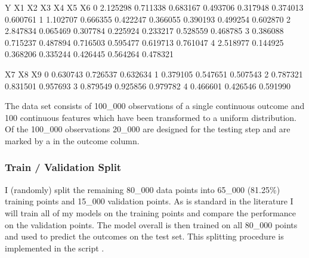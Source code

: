 \documentclass[letterpaper,10pt,english]{sphinxmanual}
\begin{document}
\begin{sphinxVerbatim}[commandchars=\\\{\}]
 
   
   
  
\end{sphinxVerbatim}

\begin{sphinxVerbatim}[commandchars=\\\{\}]
      
\PYG{p}{[} \PYG{p}{]}
\end{sphinxVerbatim}

\begin{sphinxVerbatim}[commandchars=\\\{\}]
          Y        X1        X2        X3        X4        X5        X6  \PYGZbs{}
0  2.125298  0.711338  0.683167  0.493706  0.317948  0.374013  0.600761   
1 \PYGZhy{}1.102707  0.666355  0.422247  0.366055  0.390193  0.499254  0.602870   
2 \PYGZhy{}2.847834  0.065469  0.307784  0.225924  0.233217  0.528559  0.468785   
3 \PYGZhy{}0.386088  0.715237  0.487894  0.716503  0.595477  0.619713  0.761047   
4  2.518977  0.144925  0.368206  0.335244  0.426445  0.564264  0.478321   

         X7        X8        X9  
0  0.630743  0.726537  0.632634  
1  0.379105  0.547651  0.507543  
2  0.787321  0.831501  0.957693  
3  0.879549  0.925856  0.979782  
4  0.466601  0.426546  0.591990  
\end{sphinxVerbatim}

The data set consists of 100\_000 observations of a single continuous outcome and 100 continuous features which have been transformed to a uniform distribution. Of the 100\_000 observations 20\_000 are designed for the testing step and are marked by a  in the outcome column.


\subsubsection{Train / Validation Split}
\label{\detokenize{simulated_intro:train-validation-split}}
I (randomly) split the remaining 80\_000  data points into 65\_000 (81.25\%) training points and 15\_000 validation points. As is standard in the literature I will train all of my models on the training points and compare the performance on the validation points. The  model overall is then trained on all 80\_000 points and used to predict the outcomes on the test set.
This splitting procedure is implemented in the script .
\end{document}
